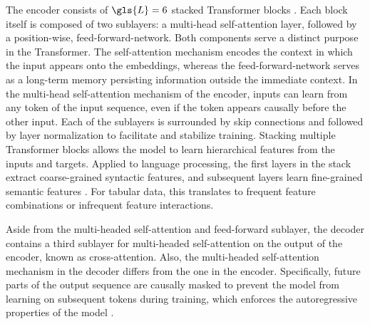 The encoder consists of $\gls{L}=6$ stacked Transformer blocks \autocite[][6]{vaswaniAttentionAllYou2017}. Each block itself is composed of two sublayers: a multi-head self-attention layer, followed by a position-wise, \gls{feed-forward-network}. Both components serve a distinct purpose in the Transformer. The self-attention mechanism encodes the context in which the input appears onto the \glspl{embedding}, whereas the \gls{feed-forward-network} serves as a long-term memory persisting information outside the immediate context. In the multi-head self-attention mechanism of the encoder, inputs can learn from any \gls{token} of the input sequence, even if the \gls{token} appears causally before the other input. Each of the sublayers is surrounded by skip connections \autocite[][2]{heDeepResidualLearning2015} and followed by layer normalization \autocite[][4]{baLayerNormalization2016} to facilitate and stabilize training. Stacking multiple Transformer blocks allows the model to learn hierarchical features from the inputs and targets. Applied to language processing, the first layers in the stack extract coarse-grained syntactic features, and subsequent layers learn fine-grained semantic features \autocites[][3651]{jawaharWhatDoesBERT2019}[][4596]{tenneyBERTRediscoversClassical2019}. For tabular data, this translates to frequent feature combinations or infrequent feature interactions.

Aside from the multi-headed self-attention and feed-forward sublayer, the decoder contains a third sublayer for multi-headed self-attention on the output of the encoder, known as cross-attention. Also, the multi-headed self-attention mechanism in the decoder differs from the one in the encoder. Specifically, future parts of the output sequence are causally masked to prevent the model from learning on subsequent \glspl{token} during training, which enforces the autoregressive properties of the model \autocites[][3]{vaswaniAttentionAllYou2017}[][15]{narangTransformerModificationsTransfer2021}.

